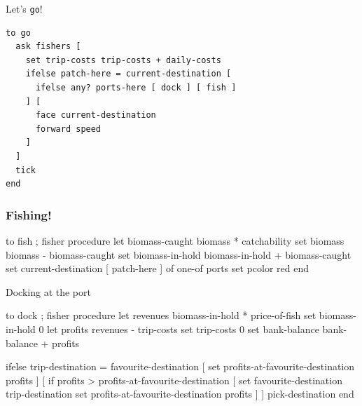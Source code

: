 \documentclass[table, 14pt, aspectratio=169]{beamer}
\begin{document}
\begin{frame}[fragile=singleslide]{Let's \texttt{go}!}
  \begin{adjustbox}{max width=\linewidth}\small
  \begin{verbatim}
to go
  ask fishers [
    set trip-costs trip-costs + daily-costs
    ifelse patch-here = current-destination [
      ifelse any? ports-here [ dock ] [ fish ]
    ] [
      face current-destination
      forward speed
    ]
  ]
  tick
end
    \end{verbatim}
  \end{adjustbox}
\end{frame}

\begin{frame}[fragile=singleslide]\frametitle{Fishing!}
  \begin{adjustbox}{max width=\linewidth}
    \begin{nlogo}
to fish ; fisher procedure
  let biomass-caught biomass * catchability
  set biomass biomass - biomass-caught
  set biomass-in-hold biomass-in-hold + biomass-caught
  set current-destination [ patch-here ] of one-of ports
  set pcolor red
end    
    \end{nlogo}
  \end{adjustbox}
\end{frame}


\begin{frame}[fragile=singleslide]{Docking at the port}
  \begin{adjustbox}{max height=0.8\textheight}
    \begin{nlogo}
to dock ; fisher procedure
  let revenues biomass-in-hold * price-of-fish
  set biomass-in-hold 0
  let profits revenues - trip-costs
  set trip-costs 0
  set bank-balance bank-balance + profits

  ifelse trip-destination = favourite-destination [
    set profits-at-favourite-destination profits
  ] [
    if profits > profits-at-favourite-destination [
      set favourite-destination trip-destination
      set profits-at-favourite-destination profits
    ]
  ]
  pick-destination
end
    \end{nlogo}
  \end{adjustbox}
\end{frame}
\end{document}
